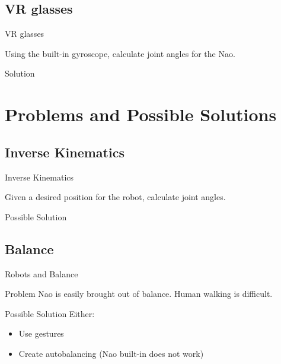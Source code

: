\documentclass{beamer}
\begin{document}
\subsection{VR glasses}
\begin{frame}[t]{VR glasses}
\begin{block}Using the built-in gyroscope, calculate joint angles for the Nao.
\end{block}
\pause
\begin{block}{Solution}

\end{block}
\end{frame}

\section{Problems and Possible Solutions}
\subsection{Inverse Kinematics}
\begin{frame}[t]{Inverse Kinematics}
\begin{block}Given a desired position for the robot, calculate joint angles.
\end{block}
\pause
\begin{block}{Possible Solution}
\begin{itemize}

\end{itemize}
\end{block}
\end{frame}

\subsection{Balance}
\begin{frame}[t]{Robots and Balance}
\begin{block}{Problem}
Nao is easily brought out of balance. Human walking is difficult.
\end{block}
\pause
\begin{block}{Possible Solution}
Either:
\begin{itemize}
\item Use gestures 
\item Create autobalancing (Nao built-in does not work)
\end{itemize}
\end{block}
\end{frame}
\end{document}
